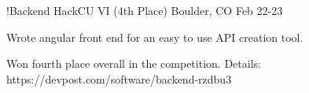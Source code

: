 

\begin{cventries}

\cventry
{!Backend} %
{HackCU VI (4th Place)} %
{Boulder, CO} %
{Feb 22-23} %
{
  \begin{cvitems} %
    \item {Wrote angular front end for an easy to use API creation tool.}
    \item {Won fourth place overall in the competition. Details: https://devpost.com/software/backend-rzdbu3}
    \end{cvitems}
}
\end{cventries}
